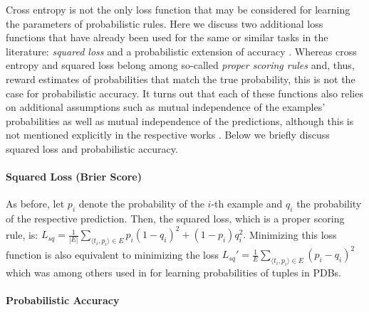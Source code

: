 \documentclass[akbc,twoside,11pt]{article}
\newcounter{example}
\begin{document}
Cross entropy is not the only loss function that may be considered for learning the parameters of probabilistic rules. Here we discuss two additional loss functions that have already been used for the same or similar tasks in the literature: {\em squared loss} \cite{theobald_learning} and a probabilistic extension of accuracy \cite{DBLP:conf/ijcai/RaedtDTBV15}. Whereas cross entropy and squared loss belong among so-called {\em proper scoring rules} \cite{gneiting2007strictly} and, thus, reward estimates of probabilities that match the true probability, this is not the case for probabilistic accuracy. It turns out that each of these functions also relies on additional assumptions such as mutual independence of the examples' probabilities as well as mutual independence of the predictions, although this is not mentioned explicitly in the respective works \cite{theobald_learning,DBLP:conf/ijcai/RaedtDTBV15}. Below we briefly discuss squared loss and probabilistic accuracy.

\paragraph{Squared Loss (Brier Score)}

As before, let $p_i$ denote the probability of the $i$-th example and $q_i$ the probability of the respective prediction. Then, the squared loss, which is a proper scoring rule, is:
$L_{sq} = \frac{1}{|E|}\sum_{\langle t_i, p_i \rangle \in E} p_i (1-q_i)^2 + (1-p_i) q_i^2.$
Minimizing this loss function is also equivalent to minimizing the loss $L_{sq}' = \frac{1}{E} \sum_{\langle t_i, p_i \rangle \in E} \left(p_i - q_i \right)^2$
which was among others used in \cite{theobald_learning} for learning probabilities of tuples in PDBs.

\paragraph{Probabilistic Accuracy}
\end{document}
